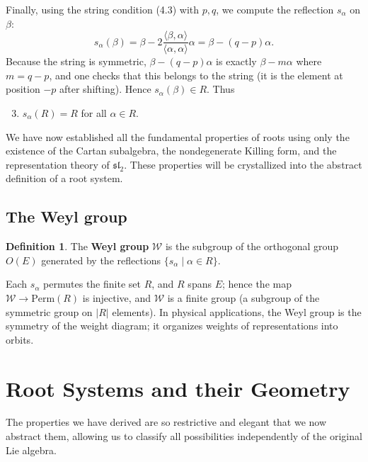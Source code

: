 \documentclass{article}
\theoremstyle{definition}
\newtheorem{definition}[theorem]{Definition}
\theoremstyle{remark}
\newcommand{\W}{\mathcal{W}}
\begin{document}
Finally, using the string condition (4.3) with $p,q$, we compute the reflection
$s_\alpha$ on $\beta$:
\[
s_\alpha(\beta) = \beta - 2\frac{\langle\beta,\alpha\rangle}{\langle\alpha,\alpha\rangle}\alpha
= \beta - (q-p)\alpha.
\]
Because the string is symmetric, $\beta - (q-p)\alpha$ is exactly $\beta - m\alpha$
where $m = q-p$, and one checks that this belongs to the string (it is the element
at position $-p$ after shifting). Hence $s_\alpha(\beta)\in R$. Thus
\begin{enumerate}
  \setcounter{enumi}{2}
  \item $s_\alpha(R) = R$ for all $\alpha\in R$.
\end{enumerate}

We have now established all the fundamental properties of roots using only the
existence of the Cartan subalgebra, the nondegenerate Killing form, and the
representation theory of $\mathfrak{sl}_2$. These properties will be crystallized
into the abstract definition of a root system.

\subsection{The Weyl group}
\begin{definition}
The \textbf{Weyl group} $\W$ is the subgroup of the orthogonal group $O(E)$ generated by
the reflections $\{s_\alpha \mid \alpha\in R\}$.
\end{definition}
Each $s_\alpha$ permutes the finite set $R$, and $R$ spans $E$; hence the map
$\W \to \text{Perm}(R)$ is injective, and $\W$ is a finite group (a subgroup of the
symmetric group on $|R|$ elements). In physical applications, the Weyl group is the
symmetry of the weight diagram; it organizes weights of representations into orbits.

\section{Root Systems and their Geometry}

The properties we have derived are so restrictive and elegant that we now abstract
them, allowing us to classify all possibilities independently of the original Lie
algebra.
\end{document}
